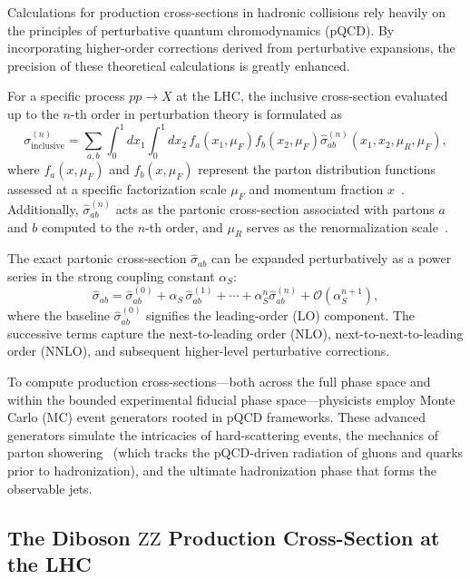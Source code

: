Calculations for production cross-sections in hadronic collisions rely heavily on the principles of perturbative quantum chromodynamics (pQCD). By incorporating higher-order corrections derived from perturbative expansions, the precision of these theoretical calculations is greatly enhanced.

For a specific process $pp \to X$ at the LHC, the inclusive cross-section evaluated up to the $n$-th order in perturbation theory is formulated as
\begin{equation}
    \sigma^{(n)}_{\text{inclusive}} 
    = 
    \sum_{a,b} \int_{0}^{1} dx_1 \int_{0}^{1} dx_2 \, f_{a}(x_1,\mu_F) f_{b}(x_2,\mu_F) \hat{\sigma}_{ab}^{(n)}(x_1,x_2,\mu_R,\mu_F),
\end{equation}
where $f_a(x,\mu_F)$ and $f_b(x,\mu_F)$ represent the parton distribution functions assessed at a specific factorization scale $\mu_F$ and momentum fraction $x$~\cite{Collins1989Factorization}. Additionally, $\hat{\sigma}_{ab}^{(n)}$ acts as the partonic cross-section associated with partons $a$ and $b$ computed to the $n$-th order, and $\mu_R$ serves as the renormalization scale~\cite{Ellis1996QCD}.

The exact partonic cross-section $\hat{\sigma}_{ab}$ can be expanded perturbatively as a power series in the strong coupling constant $\alpha_S$:
\begin{equation}
\hat{\sigma}_{ab}
=
\hat{\sigma}_{ab}^{(0)}
+
\alpha_S\,\hat{\sigma}_{ab}^{(1)}
+
\cdots
+
\alpha_S^{n}\hat{\sigma}_{ab}^{(n)}
+
\mathcal{O}(\alpha_S^{n+1}),
\end{equation}
where the baseline $\hat{\sigma}_{ab}^{(0)}$ signifies the leading-order (LO) component. The successive terms capture the next-to-leading order (NLO), next-to-next-to-leading order (NNLO), and subsequent higher-level perturbative corrections.

To compute production cross-sections—both across the full phase space and within the bounded experimental fiducial phase space—physicists employ Monte Carlo (MC) event generators rooted in pQCD frameworks. These advanced generators simulate the intricacies of hard-scattering events, the mechanics of parton showering~\cite{AltarelliParisi1977} (which tracks the pQCD-driven radiation of gluons and quarks prior to hadronization), and the ultimate hadronization phase that forms the observable jets.

\subsection{The Diboson $\text{ZZ}$ Production Cross-Section at the LHC}%
\label{sec:zz-matrix-xs}

